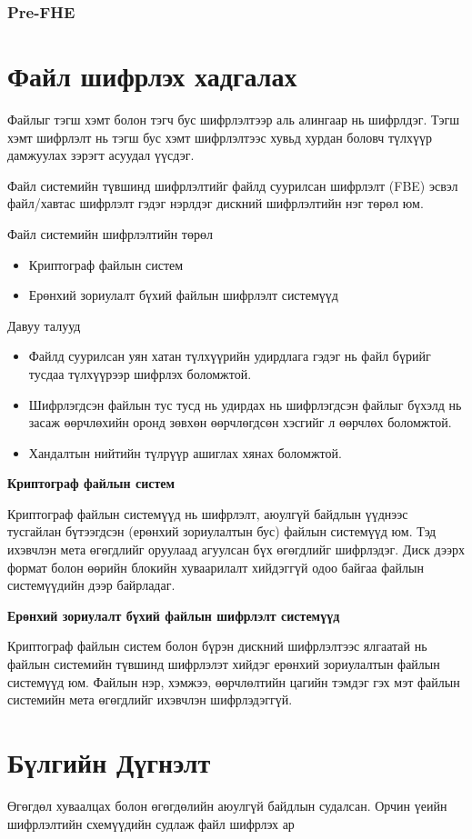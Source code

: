 \subsubsection*{Pre-FHE}

\section{Файл шифрлэх хадгалах}

Файлыг тэгш хэмт болон тэгч бус шифрлэлтээр аль алингаар нь шифрлдэг. Тэгш хэмт шифрлэлт нь тэгш бус хэмт шифрлэлтээс хувьд хурдан боловч түлхүүр дамжуулах зэрэгт асуудал үүсдэг.

Файл системийн түвшинд шифрлэлтийг файлд суурилсан шифрлэлт (FBE) эсвэл файл/хавтас шифрлэлт гэдэг нэрлдэг дискний шифрлэлтийн нэг төрөл юм.

Файл системийн шифрлэлтийн төрөл
\begin{itemize}
    \item Криптограф файлын систем
    \item Ерөнхий зориулалт бүхий файлын шифрлэлт системүүд
\end{itemize}

Давуу талууд
\begin{itemize}
    \item Файлд суурилсан уян хатан түлхүүрийн удирдлага гэдэг нь файл бүрийг тусдаа түлхүүрээр шифрлэх боломжтой.
    \item Шифрлэгдсэн файлын тус тусд нь удирдах нь шифрлэгдсэн файлыг бүхэлд нь засаж өөрчлөхийн оронд зөвхөн өөрчлөгдсөн хэсгийг л өөрчлөх боломжтой.
    \item Хандалтын нийтийн түлрүүр ашиглах хянах боломжтой.
\end{itemize}

\textbf{Криптограф файлын систем}

Криптограф файлын системүүд нь шифрлэлт, аюулгүй байдлын үүднээс тусгайлан бүтээгдсэн (ерөнхий зориулалтын бус) файлын системүүд юм. Тэд ихэвчлэн мета өгөгдлийг оруулаад агуулсан бүх өгөгдлийг шифрлэдэг. Диск дээрх формат болон өөрийн блокийн хуваарилалт хийдэггүй одоо байгаа файлын системүүдийн дээр байрладаг.

\textbf{Ерөнхий зориулалт бүхий файлын шифрлэлт системүүд}

Криптограф файлын систем болон бүрэн дискний шифрлэлтээс ялгаатай нь файлын системийн түвшинд шифрлэлэт хийдэг ерөнхий зориулалтын файлын системүүд юм. Файлын нэр, хэмжээ, өөрчлөлтийн цагийн тэмдэг гэх мэт файлын системийн мета өгөгдлийг ихэвчлэн шифрлэдэггүй.


\section{Бүлгийн Дүгнэлт}

Өгөгдөл хуваалцах болон өгөгдөлийн аюулгүй байдлын судалсан. Орчин үеийн шифрлэлтийн схемүүдийн судлаж файл шифрлэх ар
